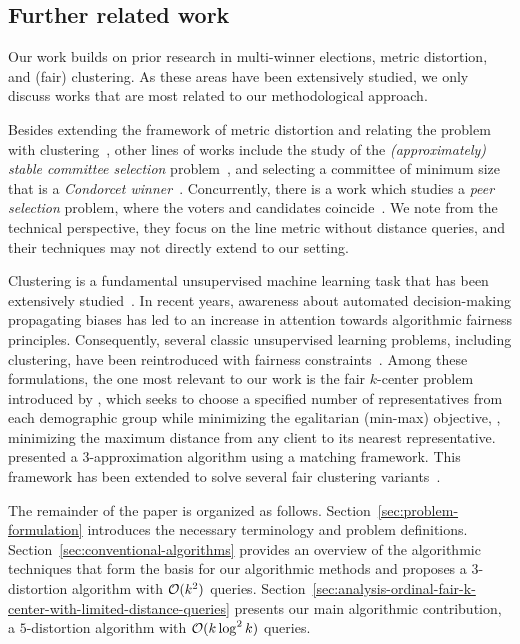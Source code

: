 

\subsection{Further related work}
Our work builds on prior research in multi-winner elections, metric distortion, and (fair) clustering. As these areas have been extensively studied, we only discuss works that are most related to our 
methodological approach.


Besides extending the framework of metric distortion and relating the problem with clustering~\cite{burkhardt2024low, pulyassary2025constant, caragiannis2022metric}, 
other lines of works include the study of the \emph{(approximately) stable committee selection} problem~\cite{fain2018fair,jiang2020approximately}, and selecting a committee of minimum size that is a \emph{Condorcet winner}~\cite{charikar2025six}.
Concurrently, there is a work which studies a \emph{peer selection} problem, where the voters and candidates coincide~\cite{cembrano2025metric}. We note from the technical perspective, they focus on the line metric without distance queries, and their techniques may not directly extend to our setting.


Clustering is a fundamental unsupervised machine learning task that has been extensively studied~\cite{jain1999data}. In recent years, awareness about automated decision-making propagating biases has led to an increase in attention towards algorithmic fairness principles. Consequently, several classic unsupervised learning problems, including clustering, have been reintroduced with fairness constraints~\cite{thejaswi2021diversity, thejaswi2022clustering,thejaswi2024diversity,gadekar2025capacitated,matakos2024fair,zhang2024parameterized,abbasi2023parameterized,gadekar2025fair,chierichetti2017fair}. Among these formulations, the one most relevant to our work is the fair $k$-center problem introduced by \citet{kleindessner2019fair}, which seeks to choose a specified number of representatives from each demographic group while minimizing the egalitarian (min-max) objective, \ie, minimizing the maximum distance from any client to its nearest representative. \citet{jones2020fair} presented a $3$-approximation algorithm using a matching framework. This framework has been extended to solve several fair clustering variants~\cite{gadekar2025fair,chen2024approximation}.

The remainder of the paper is organized as follows. 
Section~\ref{sec:problem-formulation} introduces the necessary terminology and problem definitions. 
Section~\ref{sec:conventional-algorithms} provides an overview of the algorithmic techniques that form the basis for our algorithmic methods and proposes a $3$-distortion algorithm with $\mathcal{O}(k^2)$ queries.
Section~\ref{sec:analysis-ordinal-fair-k-center-with-limited-distance-queries} presents our main algorithmic contribution, a $5$-distortion algorithm with $\mathcal{O}(k\log^2 k)$ queries.


 






